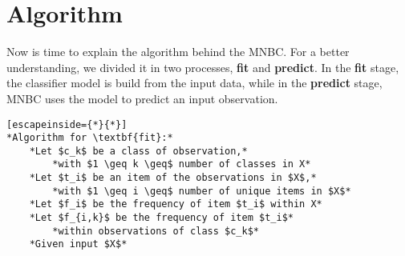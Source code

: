 \section{Algorithm}
\label{sec:algorithm}
Now is time to explain the algorithm behind the MNBC. For a better understanding, we divided it in two processes, \textbf{fit} and \textbf{predict}. In the \textbf{fit} stage, the classifier model is build from the input data, while in the \textbf{predict} stage, MNBC uses the model to predict an input observation.


\begin{lstlisting}[escapeinside={*}{*}]
*Algorithm for \textbf{fit}:*
    *Let $c_k$ be a class of observation,*
        *with $1 \geq k \geq$ number of classes in X*
    *Let $t_i$ be an item of the observations in $X$,*
        *with $1 \geq i \geq$ number of unique items in $X$*
    *Let $f_i$ be the frequency of item $t_i$ within X*
    *Let $f_{i,k}$ be the frequency of item $t_i$* 
        *within observations of class $c_k$*
    *Given input $X$*
        
\end{lstlisting}